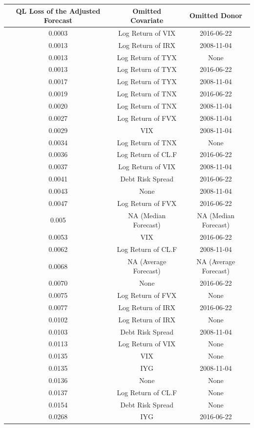 \documentclass[11pt,3p,review,authoryear]{elsarticle}
\theoremstyle{definition}
\begin{document}
\begin{table}[ht]
  \centering
   \label{tab:prediction_table_with Brexit as June 22nd, 2016} 
  \begingroup\fontsize{7pt}{8pt}\selectfont
  \begin{tabular}{ccc}
    
    \hline
 QL Loss of the Adjusted Forecast& Omitted Covariate & Omitted Donor \\ 
    \hline
    0.0003 & Log Return of VIX & 2016-06-22 \\ 
    0.0013 & Log Return of IRX & 2008-11-04 \\ 
    0.0013 & Log Return of TYX & None \\ 
    0.0013 & Log Return of TYX & 2016-06-22 \\ 
    0.0017 & Log Return of TYX & 2008-11-04 \\ 
    0.0019 & Log Return of TNX & 2016-06-22 \\ 
    0.0020 & Log Return of TNX & 2008-11-04 \\ 
    0.0027 & Log Return of FVX & 2008-11-04 \\ 
    0.0029 & VIX & 2008-11-04 \\ 
    0.0034 & Log Return of TNX & None \\ 
    0.0036 & Log Return of CL.F & 2016-06-22 \\ 
    0.0037 & Log Return of VIX & 2008-11-04 \\ 
    0.0041 & Debt Risk Spread & 2016-06-22 \\ 
    0.0043 & None & 2008-11-04 \\ 
    0.0047 & Log Return of FVX & 2016-06-22 \\ 
    \rowcolor{gray} 0.005 & NA (Median Forecast) & NA (Median Forecast)\\  
    0.0053 & VIX & 2016-06-22 \\ 
    0.0062 & Log Return of CL.F & 2008-11-04 \\
    \rowcolor{gray} 0.0068 & NA (Average Forecast) & NA (Average Forecast)\\ 
    \rowcolor{yellow} 0.0070 & None & 2016-06-22 \\ 
    0.0075 & Log Return of FVX & None \\ 
    0.0077 & Log Return of IRX & 2016-06-22 \\ 
    0.0102 & Log Return of IRX & None \\ 
    0.0103 & Debt Risk Spread & 2008-11-04 \\ 
    0.0113 & Log Return of VIX & None \\ 
    0.0135 & VIX & None \\ 
    0.0135 & IYG & 2008-11-04 \\ 
    \rowcolor{yellow} 0.0136 & None & None \\ 
    0.0137 & Log Return of CL.F & None \\ 
    0.0154 & Debt Risk Spread & None \\ 
    0.0268 & IYG & 2016-06-22 \\
     

\end{tabular}
\end{table}
\end{document}
